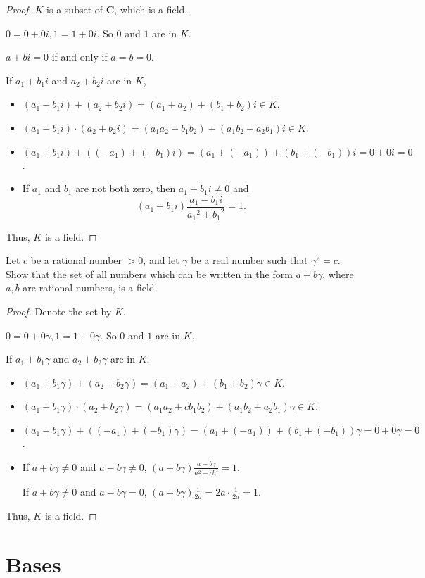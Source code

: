 \begin{proof}
    $K$ is a subset of $\mathbf{C}$, which is a field.

    $0 = 0 + 0i, 1 = 1 + 0i$. So $0$ and $1$ are in $K$.

    $a + bi = 0$ if and only if $a = b = 0$.

    If $a_{1} + b_{1}i$ and $a_{2} + b_{2}i$ are in $K$,
    \begin{itemize}
        \item $(a_{1} + b_{1}i) + (a_{2} + b_{2}i) = (a_{1} + a_{2}) + (b_{1} + b_{2})i \in K$.
        \item $(a_{1} + b_{1}i)\cdot (a_{2} + b_{2}i) = (a_{1}a_{2} - b_{1}b_{2}) + (a_{1}b_{2} + a_{2}b_{1})i \in K$.
        \item $(a_{1} + b_{1}i) + ((-a_{1}) + (-b_{1})i) = (a_{1} + (-a_{1})) + (b_{1} + (-b_{1}))i = 0 + 0i = 0$.
        \item If $a_{1}$ and $b_{1}$ are not both zero, then $a_{1} + b_{1}i \ne 0$ and
              \[
                  (a_{1} + b_{1}i)\frac{a_{1} - b_{1}i}{{a_{1}}^{2} + {b_{1}}^{2}} = 1.
              \]
    \end{itemize}

    Thus, $K$ is a field.
\end{proof}

\begin{exercise}
    Let $c$ be a rational number $> 0$, and let $\gamma$ be a real number such that ${\gamma}^{2} = c$. Show that the set of all numbers which can be written in the form $a + b\gamma$, where $a, b$ are rational numbers, is a field.
\end{exercise}

\begin{proof}
    Denote the set by $K$.

    $0 = 0 + 0\gamma, 1 = 1 + 0\gamma$. So $0$ and $1$ are in $K$.

    If $a_{1} + b_{1}\gamma$ and $a_{2} + b_{2}\gamma$ are in $K$,
    \begin{itemize}
        \item $(a_{1} + b_{1}\gamma) + (a_{2} + b_{2}\gamma) = (a_{1} + a_{2}) + (b_{1} + b_{2})\gamma \in K$.
        \item $(a_{1} + b_{1}\gamma)\cdot (a_{2} + b_{2}\gamma) = (a_{1}a_{2} + cb_{1}b_{2}) + (a_{1}b_{2} + a_{2}b_{1})\gamma \in K$.
        \item $(a_{1} + b_{1}\gamma) + ((-a_{1}) + (-b_{1})\gamma) = (a_{1} + (-a_{1})) + (b_{1} + (-b_{1}))\gamma = 0 + 0\gamma = 0$.
        \item If $a + b\gamma \ne 0$ and $a - b\gamma\ne 0$, $(a + b\gamma)\frac{a - b\gamma}{{a}^{2} - c{b}^{2}} = 1$.

              If $a + b\gamma \ne 0$ and $a - b\gamma = 0$, $(a + b\gamma)\frac{1}{2a} = 2a\cdot\frac{1}{2a} = 1$.
    \end{itemize}

    Thus, $K$ is a field.
\end{proof}

\section{Bases}

\setcounter{exercise}{0}
